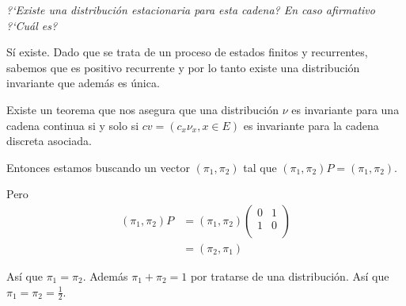 \emph{
    ?`Existe una distribuci\'on estacionaria para esta cadena? En caso afirmativo ?`Cu\'al es?\pn
}

\afterstatement\pn

Sí existe. Dado que se trata de un proceso de estados finitos y recurrentes, sabemos que es positivo
recurrente y por lo tanto existe una distribución invariante que además es única.\pn

Existe un teorema que nos asegura que una distribución $\nu$ es invariante para una cadena continua si y solo
si $cv = (c_x \nu_x, x \in E)$ es invariante para la cadena discreta asociada.\pn

Entonces estamos buscando un vector $(\pi_1, \pi_2)$ tal que $(\pi_1, \pi_2) P = (\pi_1, \pi_2)$.\pn

Pero
\begin{align}
        (\pi_1, \pi_2) P &= 
                        (\pi_1, \pi_2) 
                        \begin{pmatrix}
                            0   &   1 \\
                            1   &   0 \\
                        \end{pmatrix} \\
                        &=              
                        (\pi_2, \pi_1)
\end{align}

Así que $\pi_1 = \pi_2$. Además $\pi_1 + \pi_2 = 1$ por tratarse de una distribución. Así que $\pi_1 = \pi_2 = \frac{1}{2}$.
